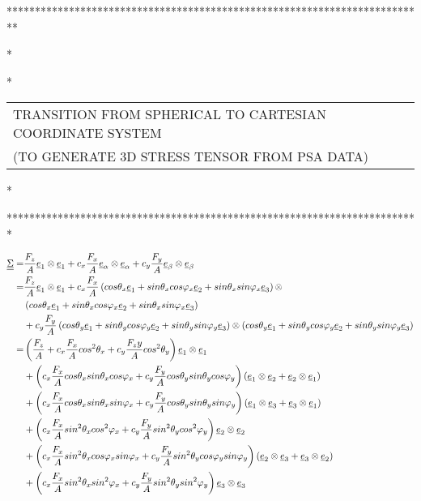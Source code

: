 \clearpage
\noindent 
**************************************************************************

\noindent 
*

\noindent 
* 
\begin{tabular}{l}
TRANSITION FROM SPHERICAL TO CARTESIAN COORDINATE SYSTEM\\
(TO GENERATE 3D STRESS TENSOR FROM PSA DATA)
\end{tabular}

\noindent 
*

\noindent 
*************************************************************************

  \begin{equation}
 \begin{split}
 \uline{\uline{\Sigma}}=&\dfrac{F_z}{A}\uline{e}_1\otimes \uline{e}_1+c_x\dfrac{F_x}{A}\uline{e}_{\alpha}\otimes \uline{e}_{\alpha}+c_y\dfrac{F_y}{A}\uline{e}_{\beta}\otimes \uline{e}_{\beta}
 \\=&\dfrac{F_z}{A}\uline{e}_1\otimes \uline{e}_1+c_x\dfrac{F_x}{A}\left(cos\theta_x\uline{e}_1+sin\theta_xcos\varphi_x\uline{e}_2+sin\theta_xsin\varphi_x\uline{e}_3 \right) \otimes \\&\left(cos\theta_x\uline{e}_1+sin\theta_xcos\varphi_x\uline{e}_2+sin\theta_xsin\varphi_x\uline{e}_3 \right)
 \\&+c_y\dfrac{F_y}{A}\left( cos\theta_y\uline{e}_1+sin\theta_ycos\varphi_y\uline{e}_2+sin\theta_ysin\varphi_y\uline{e}_3\right) \otimes\left( cos\theta_y\uline{e}_1+sin\theta_ycos\varphi_y\uline{e}_2+sin\theta_ysin\varphi_y\uline{e}_3\right)
\\=&\left(\dfrac{F_z}{A} +c_x\dfrac{F_x}{A}cos^2\theta_x+c_y\dfrac{F_zy}{A}cos^2\theta_y\right) \uline{e}_1\otimes \uline{e}_1
\\&+\left(c_x\dfrac{F_x}{A}cos\theta_xsin\theta_x cos\varphi_x+c_y\dfrac{F_y}{A}cos\theta_ysin\theta_y cos\varphi_y\right) \left( \uline{e}_1\otimes \uline{e}_2+\uline{e}_2\otimes \uline{e}_1\right) 
\\&+\left(c_x\dfrac{F_x}{A}cos\theta_xsin\theta_x sin\varphi_x+c_y\dfrac{F_y}{A}cos\theta_ysin\theta_y sin\varphi_y\right) \left( \uline{e}_1\otimes \uline{e}_3+\uline{e}_3\otimes \uline{e}_1\right) 
\\&+\left(c_x\dfrac{F_x}{A}sin^2\theta_xcos^2\varphi_x+c_y\dfrac{F_y}{A}sin^2\theta_y cos^2\varphi_y\right) \uline{e}_2\otimes \uline{e}_2
\\&+\left(c_x\dfrac{F_x}{A}sin^2\theta_x cos\varphi_xsin\varphi_x+c_y\dfrac{F_y}{A}sin^2\theta_y cos\varphi_ysin\varphi_y\right) \left( \uline{e}_2\otimes \uline{e}_3+\uline{e}_3\otimes \uline{e}_2\right) 
\\&+\left(c_x\dfrac{F_x}{A}sin^2\theta_xsin^2\varphi_x+c_y\dfrac{F_y}{A}sin^2\theta_y sin^2\varphi_y\right) \uline{e}_3\otimes \uline{e}_3
 \end{split}
 \label{tensor2}
 \end{equation}


